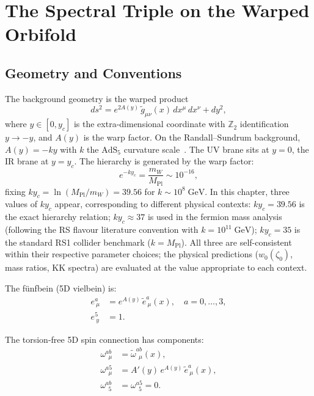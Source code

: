 \section{The Spectral Triple on the Warped Orbifold}
\label{sec:4-spectral-triple}

\subsection{Geometry and Conventions}
\label{sec:4-geometry}

The background geometry is the warped product
\begin{equation}
  ds^2 = e^{2A(y)}\, \tilde{g}_{\mu\nu}(x)\, dx^\mu\, dx^\nu + dy^2,
  \label{eq:4-2}
\end{equation}
where $y \in [0, y_c]$ is the extra-dimensional coordinate with $\mathbb{Z}_2$ identification $y \to -y$, and $A(y)$ is the warp factor. On the Randall--Sundrum background, $A(y) = -ky$ with $k$ the $\mathrm{AdS}_5$ curvature scale~\cite{ch4:RS1999a}. The UV brane sits at $y = 0$, the IR brane at $y = y_c$. The hierarchy is generated by the warp factor:
\begin{equation}
  e^{-ky_c} = \frac{m_W}{M_{\mathrm{Pl}}} \sim 10^{-16},
  \label{eq:4-3}
\end{equation}
fixing $ky_c = \ln(M_{\mathrm{Pl}}/m_W) = 39.56$ for $k \sim 10^8\;\mathrm{GeV}$.  In this chapter, three values of $ky_c$ appear, corresponding to different physical contexts: $ky_c = 39.56$ is the exact hierarchy relation; $ky_c \approx 37$ is used in the fermion mass analysis (following the RS flavour literature convention with $k = 10^{11}\;\mathrm{GeV}$); $ky_c = 35$ is the standard RS1 collider benchmark ($k = M_{\mathrm{Pl}}$).  All three are self-consistent within their respective parameter choices; the physical predictions ($w_0(\zeta_0)$, mass ratios, KK spectra) are evaluated at the value appropriate to each context.

The f\"unfbein (5D vielbein) is:
\begin{subequations}\label{eq:4-4}
\begin{align}
  e^a_{\ \mu} &= e^{A(y)}\, \tilde{e}^a_{\ \mu}(x), \quad a = 0,\ldots,3, \label{eq:4-4a}\\
  e^5_{\ y} &= 1. \label{eq:4-4b}
\end{align}
\end{subequations}

The torsion-free 5D spin connection has components:
\begin{subequations}\label{eq:4-5}
\begin{align}
  \omega^{ab}_{\ \ \mu} &= \tilde{\omega}^{ab}_{\ \ \mu}(x), \label{eq:4-5a}\\
  \omega^{a5}_{\ \ \mu} &= A'(y)\, e^{A(y)}\, \tilde{e}^a_{\ \mu}(x), \label{eq:4-5b}\\
  \omega^{ab}_{\ \ 5} &= \omega^{a5}_{\ \ 5} = 0. \label{eq:4-5c}
\end{align}
\end{subequations}

